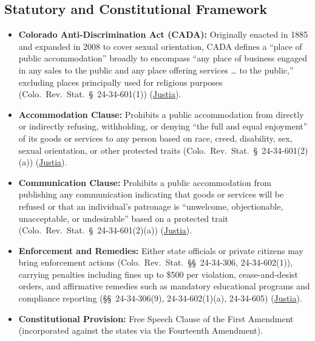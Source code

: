 \documentclass[12pt]{article}
\begin{document}
\subsection*{Statutory and Constitutional Framework}
\begin{itemize}
  \item \textbf{Colorado Anti-Discrimination Act (CADA):} Originally enacted in 1885 and expanded in 2008 to cover sexual orientation, CADA defines a ``place of public accommodation'' broadly to encompass ``any place of business engaged in any sales to the public and any place offering services \ldots{} to the public,'' excluding places principally used for religious purposes (Colo.\ Rev.\ Stat.\ \S~24-34-601(1)) (\href{https://supreme.justia.com/cases/federal/us/600/21-476/}{Justia}).
  \item \textbf{Accommodation Clause:} Prohibits a public accommodation from directly or indirectly refusing, withholding, or denying ``the full and equal enjoyment'' of its goods or services to any person based on race, creed, disability, sex, sexual orientation, or other protected traits (Colo.\ Rev.\ Stat.\ \S~24-34-601(2)(a)) (\href{https://supreme.justia.com/cases/federal/us/600/21-476/}{Justia}).
  \item \textbf{Communication Clause:} Prohibits a public accommodation from publishing any communication indicating that goods or services will be refused or that an individual's patronage is ``unwelcome, objectionable, unacceptable, or undesirable'' based on a protected trait (Colo.\ Rev.\ Stat.\ \S~24-34-601(2)(a)) (\href{https://supreme.justia.com/cases/federal/us/600/21-476/}{Justia}).
  \item \textbf{Enforcement and Remedies:} Either state officials or private citizens may bring enforcement actions (Colo.\ Rev.\ Stat.\ \S\S~24-34-306, 24-34-602(1)), carrying penalties including fines up to \$500 per violation, cease-and-desist orders, and affirmative remedies such as mandatory educational programs and compliance reporting (\S\S~24-34-306(9), 24-34-602(1)(a), 24-34-605) (\href{https://supreme.justia.com/cases/federal/us/600/21-476/}{Justia}).
  \item \textbf{Constitutional Provision:} Free Speech Clause of the First Amendment (incorporated against the states via the Fourteenth Amendment).
\end{itemize}
\end{document}
